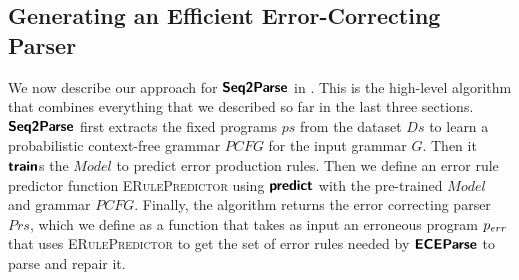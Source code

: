 \subsection{Generating an Efficient Error-Correcting Parser}
\label{sec:whole-system:building-ecp}



We now describe our approach for $\bm{\mathsf{Seq2Parse}}$ in . This is
the high-level algorithm that combines everything that we described so far in
the last three sections. $\bm{\mathsf{Seq2Parse}}$ first extracts the fixed programs $ps$
from the dataset $Ds$ to learn a probabilistic context-free grammar $PCFG$ for
the input grammar $G$. Then it $\bm{\mathsf{train}}$s the $Model$ to predict error
production rules. Then we define an error rule predictor function
\textsc{ERulePredictor} using $\bm{\mathsf{predict}}$ with the pre-trained $Model$ and
grammar $PCFG$. Finally, the algorithm returns the error correcting parser
$Prs$, which we define as a function that takes as input an erroneous program
$p_{err}$ that uses \textsc{ERulePredictor} to get the set of error rules needed
by $\bm{\mathsf{ECEParse}}$ to parse and repair it.
